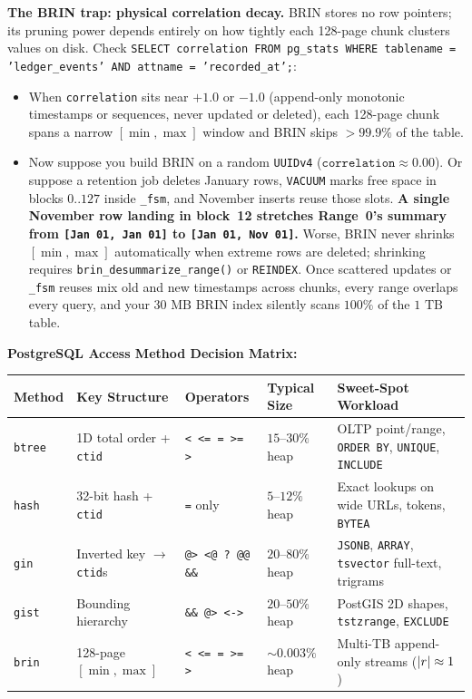 \begin{attackbox}
\textbf{The BRIN trap: physical correlation decay.} BRIN stores no row pointers; its pruning power depends entirely on how tightly each 128-page chunk clusters values on disk. Check \texttt{SELECT correlation FROM pg\_stats WHERE tablename = 'ledger\_events' AND attname = 'recorded\_at';}:
\begin{itemize}
  \item When \texttt{correlation} sits near $+1.0$ or $-1.0$ (append-only monotonic timestamps or sequences, never updated or deleted), each 128-page chunk spans a narrow $[\min, \max]$ window and BRIN skips $> 99.9\%$ of the table.
  \item Now suppose you build BRIN on a random \texttt{UUIDv4} ($\texttt{correlation} \approx 0.00$). Or suppose a retention job deletes January rows, \texttt{VACUUM} marks free space in blocks $0..127$ inside \texttt{\_fsm}, and November inserts reuse those slots. \textbf{A single November row landing in block~12 stretches Range~0's summary from \texttt{[Jan 01, Jan 01]} to \texttt{[Jan 01, Nov 01]}.} Worse, BRIN never shrinks $[\min, \max]$ automatically when extreme rows are deleted; shrinking requires \texttt{brin\_desummarize\_range()} or \texttt{REINDEX}. Once scattered updates or \texttt{\_fsm} reuses mix old and new timestamps across chunks, every range overlaps every query, and your $30\text{ MB}$ BRIN index silently scans $100\%$ of the $1\text{ TB}$ table.
\end{itemize}
\end{attackbox}

\begin{complexitybox}
\textbf{PostgreSQL Access Method Decision Matrix:}
\begin{center}
\scriptsize
\setlength{\tabcolsep}{4.5pt}
\begin{tabular}{@{}lllp{1.85cm}p{4.35cm}@{}}
\toprule
\textbf{Method} & \textbf{Key Structure} & \textbf{Operators} & \textbf{Typical Size} & \textbf{Sweet-Spot Workload} \\
\midrule
\texttt{btree} & 1D total order + \texttt{ctid} & \texttt{< <= = >= >} & $15\text{--}30\%$ heap & OLTP point/range, \texttt{ORDER BY}, \texttt{UNIQUE}, \texttt{INCLUDE} \\
\texttt{hash} & 32-bit hash + \texttt{ctid} & \texttt{=} only & $5\text{--}12\%$ heap & Exact lookups on wide URLs, tokens, \texttt{BYTEA} \\
\texttt{gin} & Inverted key $\to$ \texttt{ctid}s & \texttt{@> <@ ? @@ \&\&} & $20\text{--}80\%$ heap & \texttt{JSONB}, \texttt{ARRAY}, \texttt{tsvector} full-text, trigrams \\
\texttt{gist} & Bounding hierarchy & \texttt{\&\& @> <->} & $20\text{--}50\%$ heap & PostGIS 2D shapes, \texttt{tstzrange}, \texttt{EXCLUDE} \\
\texttt{brin} & 128-page $[\min,\max]$ & \texttt{< <= = >= >} & $\sim 0.003\%$ heap & Multi-TB append-only streams ($\lvert r\rvert \approx 1$) \\
\bottomrule
\end{tabular}
\end{center}
\end{complexitybox}


